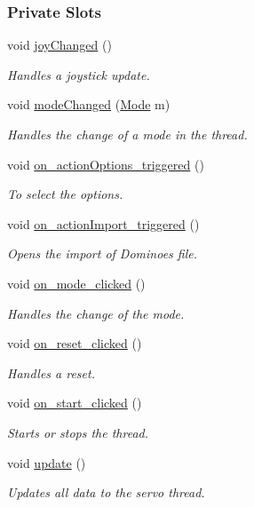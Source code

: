 \subsubsection*{Private Slots}
\begin{DoxyCompactItemize}
\item 
void \hyperlink{a00005_abb4c2d8a79c9f80010ea031366bf8226}{joy\+Changed} ()
\begin{DoxyCompactList}\small\item\em Handles a joystick update. \end{DoxyCompactList}\item 
void \hyperlink{a00005_ac5254b38dd1e34b14e2539905c64e2d8}{mode\+Changed} (\hyperlink{a00009_a8d581034e60792a9995d44065f6140a5}{Mode} m)
\begin{DoxyCompactList}\small\item\em Handles the change of a mode in the thread. \end{DoxyCompactList}\item 
void \hyperlink{a00005_a1dd57ccb62bc6f5a361aba6e088dd2e1}{on\+\_\+action\+Options\+\_\+triggered} ()
\begin{DoxyCompactList}\small\item\em To select the options. \end{DoxyCompactList}\item 
void \hyperlink{a00005_a73be2df93057d846aa541dffb00e7144}{on\+\_\+action\+Import\+\_\+triggered} ()
\begin{DoxyCompactList}\small\item\em Opens the import of Dominoes file. \end{DoxyCompactList}\item 
void \hyperlink{a00005_a26cc0e0a380ffbd33264c333d3ba1859}{on\+\_\+mode\+\_\+clicked} ()
\begin{DoxyCompactList}\small\item\em Handles the change of the mode. \end{DoxyCompactList}\item 
void \hyperlink{a00005_a0df9b8dd6a148bcf9d09c72227ec26ef}{on\+\_\+reset\+\_\+clicked} ()
\begin{DoxyCompactList}\small\item\em Handles a reset. \end{DoxyCompactList}\item 
void \hyperlink{a00005_ae66e9ab15f911b93fce0f161d2fde880}{on\+\_\+start\+\_\+clicked} ()
\begin{DoxyCompactList}\small\item\em Starts or stops the thread. \end{DoxyCompactList}\item 
void \hyperlink{a00005_a128f71880d4b9683149023fc46fcc9f8}{update} ()
\begin{DoxyCompactList}\small\item\em Updates all data to the servo thread. \end{DoxyCompactList}\end{DoxyCompactItemize}
